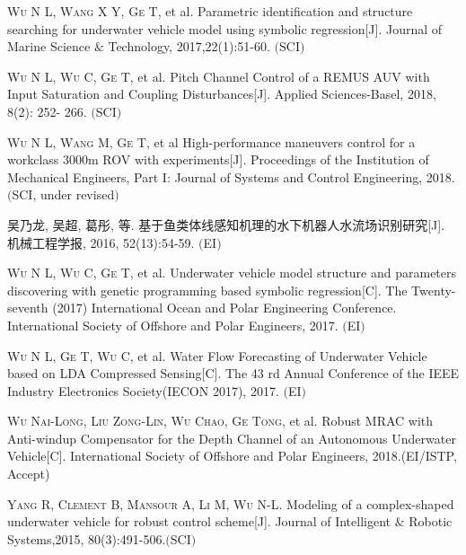 
\begin{publications}{99}
    
    \item \textsc{Wu N L, Wang X Y, Ge T}, et al. {Parametric identification and structure searching for underwater vehicle model using symbolic regression}[J].  Journal of Marine Science $\&$ Technology, 2017,22(1):51-60. $($SCI$)$
    
    \item \textsc{Wu N L, Wu C, Ge T}, et al. {Pitch Channel Control of a REMUS AUV with Input Saturation and Coupling Disturbances}[J]. Applied Sciences-Basel, 2018, 8(2): 252- 266. $($SCI$)$  

    \item \textsc{Wu N L, Wang M, Ge T}, et al {High-performance maneuvers control for a workclass
	3000m ROV with experiments}[J]. Proceedings of the Institution of Mechanical Engineers, Part I: Journal of Systems and Control Engineering, 2018.$($SCI, under revised$)$
    
    \item 吴乃龙, 吴超, 葛彤, 等. {基于鱼类体线感知机理的水下机器人水流场识别研究}[J]. 机械工程学报, 2016, 52(13):54-59. $($EI$)$
    
    \item \textsc{Wu N L, Wu C, Ge T}, et al. {Underwater vehicle model structure and parameters discovering with genetic programming based
    symbolic regression}[C]. The Twenty-seventh (2017) International Ocean and Polar Engineering Conference. International Society of Offshore and Polar Engineers, 2017. $($EI$)$

    \item \textsc{Wu N L, Ge T, Wu C}, et al. {Water Flow Forecasting of Underwater Vehicle
    based on LDA Compressed Sensing}[C]. The 43 rd Annual Conference of the IEEE Industry Electronics Society(IECON 2017), 2017. $($EI$)$

    \item \textsc{Wu Nai-Long, Liu Zong-Lin, Wu Chao, Ge Tong}, et al. {Robust MRAC with Anti-windup
    Compensator for the Depth Channel of an Autonomous Underwater Vehicle}[C]. International
    Society of Offshore and Polar Engineers, 2018.(EI/ISTP, Accept)


    \item \textsc{Yang R, Clement B, Mansour A, Li M, Wu N-L}. {Modeling of a complex-shaped underwater vehicle for robust control scheme}[J]. Journal of Intelligent $\&$ Robotic Systems,2015, 80(3):491-506.$($SCI$)$    

\end{publications}


